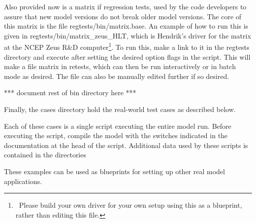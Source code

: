 \noindent
Also provided now is a matrix if regression tests, used by the code developers
to assure that new model versions do not break older model versions. The core
of this matrix is the file {\file regtests/bin/matrix.base}. An example of how
to run this is given in {\file regtests/bin/matrix\_zeus\_HLT}, which is
Hendrik's driver for the matrix at the NCEP Zeus R\&D
computer\footnote{~Please build your own driver for your own setup using this
  as a blueprint, rather than editing this file.}. To run this, make a link to
it in the {\file regtests} directory and execute after setting the desired
option flags in the script. This will make a file {\file matrix} in {\file
  retests}, which can then be run interactively or in batch mode as
desired. The file can also be manually edited further if so desired.


\vspace{\baselineskip}
\centerline{*** document rest of {\file bin} directory here ***}

\vspace{\baselineskip} \noindent Finally, the {\file cases} directory hold the
real-world test cases as described below.

\begin{flist}
\end{flist}

\noindent
Each of these cases is a single script executing the entire model run. Before
executing the script, compile the model with the switches indicated in the
documentation at the head of the script. Additional data used by these scripts
is contained in the directories

\begin{flist}
\end{flist}

\noindent
These examples can be used as blueprints for setting up other real model
applications. 


